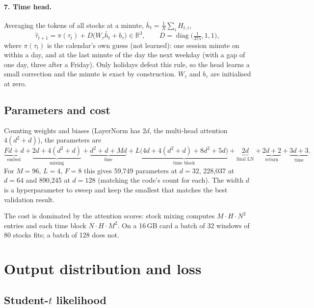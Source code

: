 \documentclass[11pt]{article}
\newcommand{\R}{\mathbb{R}}
\begin{document}
\paragraph{7. Time head.} Averaging the tokens of all stocks at a minute, $\bar h_t=\tfrac1N\sum_iH_{t,i}$,
\begin{equation}
  \hat\tau_{t+1}=\pi(\tau_t)+D\big(W_\tau\bar h_t+b_\tau\big)\in\R^{3},\qquad D=\operatorname{diag}\big(\tfrac1{375},1,1\big),
\end{equation}
where $\pi(\tau_t)$ is the calendar's own guess (not learned): one session minute on within a day, and at the last minute of the day the next weekday
(with a gap of one day, three after a Friday). Only holidays defeat this rule, so the head learns a small correction and the minute is exact by construction.
$W_\tau$ and $b_\tau$ are initialised at zero.

\subsection{Parameters and cost}

Counting weights and biases (LayerNorm has $2d$, the multi-head attention $4(d^2+d)$), the parameters are
\begin{equation}
  \underbrace{Fd+d}_{\text{embed}}+\underbrace{2d+4(d^2+d)}_{\text{mixing}}+\underbrace{d^2+d+Md}_{\text{fuse}}
  +L\underbrace{\big(4d+4(d^2+d)+8d^2+5d\big)}_{\text{time block}}+\underbrace{2d}_{\text{final LN}}+\underbrace{2d+2}_{\text{return}}+\underbrace{3d+3}_{\text{time}}.
\end{equation}
For $M{=}96$, $L{=}4$, $F{=}8$ this gives 59{,}749 parameters at $d{=}32$, 228{,}037 at $d{=}64$ and 890{,}245 at $d{=}128$
(matching the code's count for each). The width $d$ is a hyperparameter to sweep and keep the smallest that matches the best validation result.

The cost is dominated by the attention scores: stock mixing computes $M\cdot H\cdot N^2$ entries and each time block $N\cdot H\cdot M^2$. On a 16\,GB card a batch of 32 windows of 80 stocks fits; a batch of
128 does not.

\section{Output distribution and loss}\label{sec:loss}

\subsection{\texorpdfstring{Student-$t$}{Student-t} likelihood}
\end{document}

